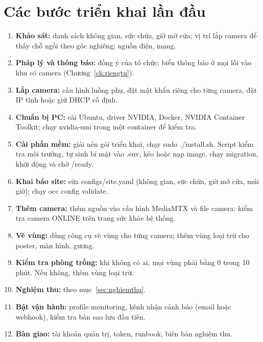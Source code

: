 \documentclass[10pt,a4paper,oneside,openany]{report}
\newcommand{\breakus}{\textunderscore\allowbreak}
\newcommand{\file}[1]{{\ttfamily\let\_\breakus #1}}
\newcommand{\code}[1]{{\ttfamily\let\_\breakus #1}}
\begin{document}
\section{Các bước triển khai lần đầu}\label{sec:buoctrienkhai}
\begin{enumerate}
  \item \textbf{Khảo sát:} danh sách không gian, sức chứa, giờ mở cửa; vị trí lắp camera để thấy chỗ ngồi theo góc nghiêng; nguồn điện, mạng.
  \item \textbf{Pháp lý và thông báo:} đồng ý của tổ chức; biển thông báo ở mọi lối vào khu có camera (Chương~\ref{ch:riengtu}).
  \item \textbf{Lắp camera:} cấu hình luồng phụ, đặt mật khẩu riêng cho từng camera, đặt IP tĩnh hoặc giữ DHCP cố định.
  \item \textbf{Chuẩn bị PC:} cài Ubuntu, driver NVIDIA, Docker, NVIDIA Container Toolkit; chạy \code{nvidia-smi} trong một container để kiểm tra.
  \item \textbf{Cài phần mềm:} giải nén gói triển khai, chạy \code{sudo ./install.sh}. Script kiểm tra môi trường, tự sinh bí mật vào \file{.env},
        kéo hoặc nạp image, chạy migration, khởi động và chờ \code{/ready}.
  \item \textbf{Khai báo site:} sửa \file{configs/site.yaml} (không gian, sức chứa, giờ mở cửa, múi giờ); chạy \code{occ config validate}.
  \item \textbf{Thêm camera:} thêm nguồn vào cấu hình MediaMTX và file camera; kiểm tra camera \code{ONLINE} trên trang sức khỏe hệ thống.
  \item \textbf{Vẽ vùng:} dùng công cụ vẽ vùng cho từng camera; thêm vùng loại trừ cho poster, màn hình, gương.
  \item \textbf{Kiểm tra phòng trống:} khi không có ai, mọi vùng phải bằng 0 trong 10 phút. Nếu không, thêm vùng loại trừ.
  \item \textbf{Nghiệm thu:} theo mục~\ref{sec:nghiemthu}.
  \item \textbf{Bật vận hành:} profile \code{monitoring}, kênh nhận cảnh báo (email hoặc webhook), kiểm tra bản sao lưu đầu tiên.
  \item \textbf{Bàn giao:} tài khoản quản trị, token, runbook, biên bản nghiệm thu.
\end{enumerate}
\end{document}
